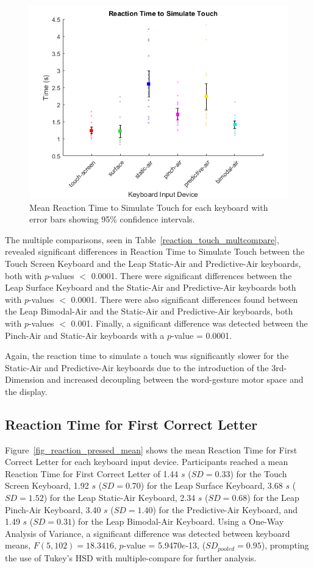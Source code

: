 \begin{figure}[h]
	\centering
	\includegraphics{fig_reaction_touch_mean}
	\caption[Mean Reaction Time to Simulate Touch]{Mean Reaction Time to Simulate Touch for each keyboard with error bars showing 95\% confidence intervals.}
	\label{fig_reaction_touch_mean}
\end{figure}

The multiple comparisons, seen in Table~\ref{reaction_touch_multcompare}, revealed significant differences in Reaction Time to Simulate Touch between the Touch Screen Keyboard and the Leap Static-Air and Predictive-Air keyboards, both with $p$-values $<$ 0.0001. There were significant differences between the Leap Surface Keyboard and the Static-Air and Predictive-Air keyboards both with $p$-values $<$ 0.0001. There were also significant differences found between the Leap Bimodal-Air and the Static-Air and Predictive-Air keyboards, both with $p$-values $<$ 0.001. Finally, a significant difference was detected between the Pinch-Air and Static-Air keyboards with a $p$-value = 0.0001.

Again, the reaction time to simulate a touch was significantly slower for the Static-Air and Predictive-Air keyboards due to the introduction of the 3rd-Dimension and increased decoupling between the word-gesture motor space and the display.

\subsection{Reaction Time for First Correct Letter}
Figure~\ref{fig_reaction_pressed_mean} shows the mean Reaction Time for First Correct Letter for each keyboard input device. Participants reached a mean Reaction Time for First Correct Letter of 1.44 $s$ ($SD = 0.33$) for the Touch Screen Keyboard, 1.92 $s$ ($SD = 0.70$) for the Leap Surface Keyboard, 3.68 $s$ ($SD = 1.52$) for the Leap Static-Air Keyboard, 2.34 $s$ ($SD = 0.68$) for the Leap Pinch-Air Keyboard, 3.40 $s$ ($SD = 1.40$) for the Predictive-Air Keyboard, and 1.49 $s$ ($SD = 0.31$) for the Leap Bimodal-Air Keyboard. Using a One-Way Analysis of Variance, a significant difference was detected between keyboard means, $F(5, 102) = 18.3416$, $p$-value = 5.9470$e$-13, ($SD_{pooled} = 0.95$), prompting the use of Tukey's HSD with multiple-compare for further analysis.

